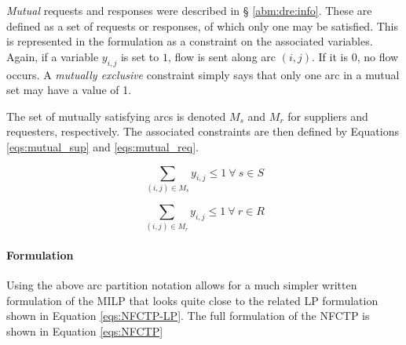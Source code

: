 \textit{Mutual} requests and responses were described in \S
\ref{abm:dre:info}. These are defined as a set of requests or responses, of
which only one may be satisfied. This is represented in the formulation as a
constraint on the associated variables. Again, if a variable $y_{i,j}$ is set to
$1$, flow is sent along arc $(i, j)$. If it is $0$, no flow occurs. A
\textit{mutually exclusive} constraint simply says that only one arc in a mutual
set may have a value of 1.

The set of mutually satisfying arcs is denoted $M_s$ and $M_r$ for suppliers and
requesters, respectively. The associated constraints are then defined by
Equations \ref{eqs:mutual_sup} and \ref{eqs:mutual_req}.

\begin{equation}\label{eqs:mutual_sup}
  \sum_{(i, j) \in M_{s}} y_{i,j} \leq 1 \: \forall \: s \in S 
\end{equation}

\begin{equation}\label{eqs:mutual_req}
  \sum_{(i, j) \in M_{r}} y_{i,j} \leq 1 \: \forall \: r \in R 
\end{equation}

\paragraph{Formulation}

Using the above arc partition notation allows for a much simpler written
formulation of the MILP that looks quite close to the related LP formulation
shown in Equation \ref{eqs:NFCTP-LP}. The full formulation of the NFCTP is shown
in Equation \ref{eqs:NFCTP}

